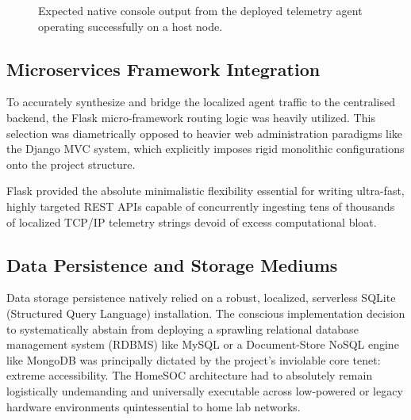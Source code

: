 \begin{figure}[h]
    \centering
    \caption{Expected native console output from the deployed telemetry agent operating successfully on a host node.}
    \label{fig:agent_console}
\end{figure}

\subsection{Microservices Framework Integration}
To accurately synthesize and bridge the localized agent traffic to the centralised backend, the Flask micro-framework routing logic was heavily utilized. This selection was diametrically opposed to heavier web administration paradigms like the Django MVC system, which explicitly imposes rigid monolithic configurations onto the project structure. 

Flask provided the absolute minimalistic flexibility essential for writing ultra-fast, highly targeted REST APIs capable of concurrently ingesting tens of thousands of localized TCP/IP telemetry strings devoid of excess computational bloat. 

\subsection{Data Persistence and Storage Mediums}
Data storage persistence natively relied on a robust, localized, serverless SQLite (Structured Query Language) installation. The conscious implementation decision to systematically abstain from deploying a sprawling relational database management system (RDBMS) like MySQL or a Document-Store NoSQL engine like MongoDB was principally dictated by the project's inviolable core tenet: extreme accessibility. The HomeSOC architecture had to absolutely remain logistically undemanding and universally executable across low-powered or legacy hardware environments quintessential to home lab networks.

